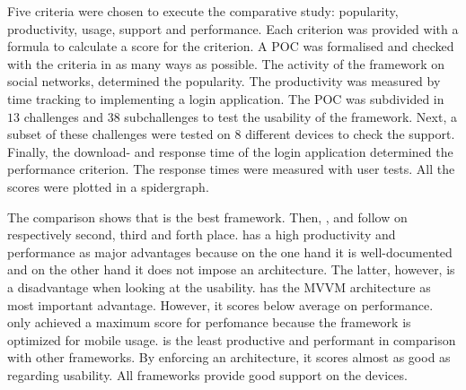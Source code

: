\documentclass[a4paper]{artikel3}
\begin{document}
Five criteria were chosen to execute the comparative study:  popularity,  productivity,  usage,  support and performance.
Each criterion was provided with a formula to calculate a score for the criterion.
A POC was formalised and checked with the criteria in as many ways as possible.
The activity of the framework on social networks, determined the popularity.
The productivity was measured by time tracking to implementing a login application.
The POC was subdivided in $13$ challenges and $38$ subchallenges to test the usability of the framework.
Next,  a subset of these challenges were tested on $8$ different devices to check the support.
Finally,  the download- and response time of the login application determined the performance criterion.
The response times were measured with user tests.
All the scores were plotted in a spidergraph.

The comparison shows that \jqma{} is the best framework.
Then, \kendoa{},  \lungo{} and \sta{} follow on respectively second, third and forth place.
\jqma{} has a high productivity and performance as major advantages because on the one hand it is well-documented and on the other hand it does not impose an architecture.
The latter,  however,  is a disadvantage when looking at the usability.
\kendoa{} has the MVVM architecture as most important advantage.
However,  it scores below average on performance.
\lungo{} only achieved a maximum score for perfomance because the framework is optimized for mobile usage.
\sta{} is the least productive and performant in comparison with other frameworks.
By enforcing an architecture,  it scores almost as good as \kendo{} regarding usability.
All frameworks provide good support on the devices.



%


\end{document}
